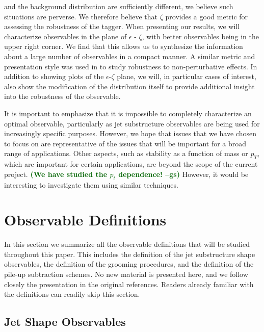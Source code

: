 \documentclass[11pt,letterpaper]{article}
\newcommand{\gs}[1]{\textbf{\textcolor{darkgreen}{(#1 --gs)}}}
\begin{document}
and the background distribution are sufficiently different, we believe
such situations are perverse. We therefore believe that $\zeta$
provides a good metric for assessing the robustness of the
tagger. When presenting our results, we will characterize observables
in the plane of $\epsilon$ - $\zeta$, with better observables being in
the upper right corner. We find that this allows us to synthesize the
information about a large number of observables in a compact manner. A
similar metric and presentation style was used in \cite{Salam:2016yht}
to study robustness to non-perturbative effects. In addition to
showing plots of the $\epsilon$-$\zeta$ plane, we will, in particular
cases of interest, also show the modification of the distribution
itself to provide additional insight into the robustness of the
observable.


It is important to emphasize that it is impossible to completely
characterize an optimal observable, particularly as jet substructure
observables are being used for increasingly specific
purposes. However, we hope that issues that we have chosen to focus on
are representative of the issues that will be important for a broad
range of applications. Other aspects, such as stability as a function
of mass or $p_T$, which are important for certain applications, are
beyond the scope of the current project. \gs{We have studied the $p_t$
  dependence!} However, it would be interesting to investigate them
using similar techniques.


\section{Observable Definitions}\label{sec:obs_def}

In this section we summarize all the observable definitions that will be studied throughout this paper. This includes the definition of the jet substructure shape observables, the definition of the grooming procedures, and the definition of the pile-up subtraction schemes.  No new material is presented here, and we follow closely the presentation in the original references. Readers already familiar with the definitions can readily skip this section.



\subsection{Jet Shape Observables}\label{sec:shape_def}
\end{document}
